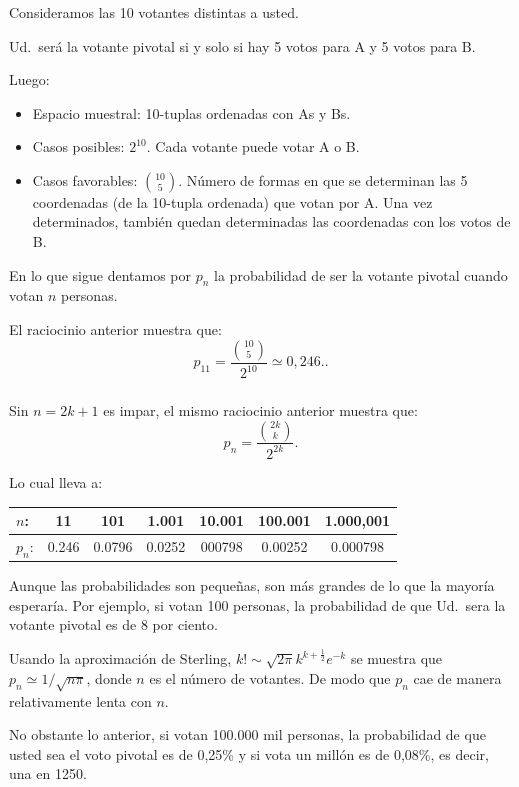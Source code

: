 \documentclass[9pt,handout]{beamer}
\begin{document}
\begin{frame}
\frametitle{}

Consideramos las 10 votantes distintas a usted. 

\bigskip

Ud.\ será la votante pivotal si y solo si
hay 5 votos para A y 5 votos para B.

\bigskip

Luego:

\begin{itemize}
\item Espacio muestral: 10-tuplas ordenadas con As  y Bs.
\item Casos posibles: $2^{10}$. Cada votante puede votar A o B. 
\item Casos favorables: $\binom{10}{5}$. Número de formas
en que se determinan las 5 coordenadas (de la 10-tupla
ordenada) que votan por A. Una vez determinados,
también quedan determinadas las coordenadas
con los votos de B.
\end{itemize}

\bigskip

En lo que sigue dentamos por $p_n$ la probabilidad
de ser la votante pivotal cuando votan $n$ personas. 

\bigskip

El raciocinio anterior muestra que:
\[
p_{11} = \frac{\binom{10}{5}}{2^{10}} \simeq 0,246..
\]
\end{frame}

\begin{frame}
\frametitle{}

Sin $n=2k+1$ es impar, el mismo raciocinio anterior
muestra que:
\[
p_{n} = \frac{\binom{2k}{k}}{2^{2k}}.
\]

\bigskip

Lo cual lleva a:

\begin{center}
\begin{tabular}{lcccccc}
\toprule
$n$:     & 11          & 101        & 1.001       & 10.001 & 100.001 & 1.000,001 \\
\midrule
$p_n$: &  0.246   & 0.0796    &  0.0252    & 000798 & 0.00252  & 0.000798                               \\
\bottomrule
\end{tabular}
\end{center}

\bigskip

Aunque las probabilidades son pequeñas, son más grandes
de lo que la mayoría esperaría. Por ejemplo, si votan 100
personas, la probabilidad de que Ud.\ sera la votante pivotal
es de 8 por ciento. 

\bigskip

Usando la aproximación de Sterling,
 $k! \sim \sqrt{2\pi}k^{k+\frac{1}{2}}e^{-k}$
se muestra que
$p_n \simeq 1/\sqrt{n\pi}$, 
          donde $n$ es el número de votantes. 
De modo que $p_n$ cae de manera
relativamente lenta con $n$. 

\bigskip

No obstante lo anterior,  
si votan 100.000 mil personas, la probabilidad de que usted
sea el voto pivotal es de 0,25\% y si vota un millón es
de 0,08\%, es decir, una en 1250. 
\end{frame}
\end{document}
